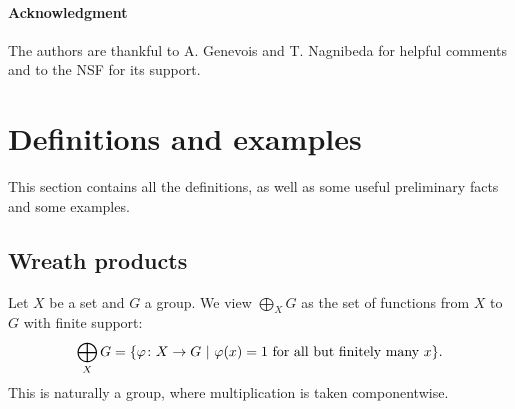 \documentclass[a4paper]{article}
\theoremstyle{definition}
\newcommand{\setst}[2]{\{#1\ |\ #2\}}
\begin{document}
\paragraph{Acknowledgment}
The authors are thankful to A. Genevois and T. Nagnibeda for helpful comments and to the NSF for its support.
%
%
%
%
%
%
%
%
%
%
%
%
%
\section{Definitions and examples}\label{Section:Def}
This section contains all the definitions, as well as some useful preliminary facts and some examples.
%
%
%
%
%
%
%
%
%
%
\subsection{Wreath products}
%
%
%
%
%
Let $X$ be a set and $G$ a group. We view
$\bigoplus_XG$ as the set of functions from $X$ to $G$ with finite support:
\[
	\bigoplus_XG=\setst{\varphi\colon X\to G}{\varphi(x)=1 \textnormal{ for all but finitely many }x}.
\]
This is naturally a group, where multiplication is taken componentwise.
\end{document}

